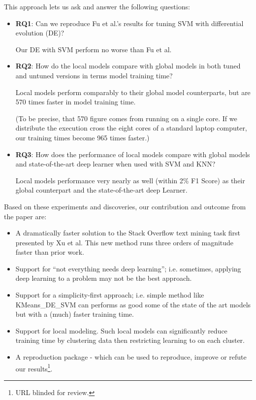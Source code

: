 \documentclass[sigconf]{acmart}
\theoremstyle{break}
\begin{document}
  \newpage\noindent
  This approach lets us ask and answer the following questions:
    \begin{itemize}
        \item 
            \textbf{RQ1}:  Can we reproduce Fu et al.'s results for tuning SVM with differential evolution (DE)?
            \begin{lesson}
                Our DE with SVM perform no worse than Fu et al.
            \end{lesson}
        \item 
            \textbf{RQ2}:    How do the local models compare with global models in both tuned and untuned versions in terms model training time?
            \begin{lesson}
                Local models perform comparably to their global model counterparts, but are 570 times faster in model training time.
            \end{lesson}
            (To be precise,  that   570 figure comes from running on a single core. If we distribute the execution cross the eight cores of a standard laptop computer, our training times
            become 965 times faster.)
        \item 
            \textbf{RQ3}:   How does the performance of local models compare with global models and state-of-the-art deep learner when used with SVM and KNN?
            \begin{lesson}  
                Local models performance very nearly as well (within  2\% F1 Score) as their global counterpart and the state-of-the-art deep Learner.
            \end{lesson}
    \end{itemize}
    Based on these experiments and discoveries, our contribution and outcome from the paper are:
    \begin{itemize}
     \item  A dramatically faster solution to the Stack Overflow text mining task first
     presented by Xu et al. This  new method
     runs three orders of magnitude faster than prior work.
        \item Support for ``not everything needs deep learning'';  i.e. sometimes, applying
        deep learning to a problem may not be the
        best approach.
        \item Support for  a simplicity-first approach; i.e.
         simple method like KMeans\_DE\_SVM   can performs as good some of the state of the art models but with a (much) faster training time.
        \item Support for local modeling. Such local
        models   can significantly reduce training time by  clustering data then restricting learning to  on each cluster.  
        \item  A reproduction package - which can be used to reproduce, improve or refute our results\footnote{URL blinded for review.}.

    \end{itemize}
\end{document}
